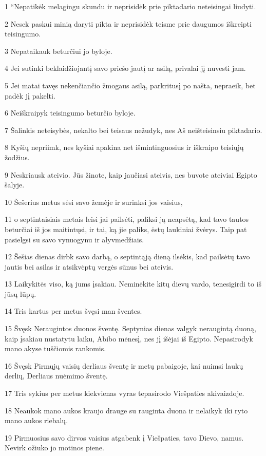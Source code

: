 \par 1 “Nepatikėk melagingu skundu ir neprisidėk prie piktadario neteisingai liudyti. 
\par 2 Nesek paskui minią daryti pikta ir neprisidėk teisme prie daugumos iškreipti teisingumo. 
\par 3 Nepataikauk beturčiui jo byloje. 
\par 4 Jei sutinki beklaidžiojantį savo priešo jautį ar asilą, privalai jį nuvesti jam. 
\par 5 Jei matai tavęs nekenčiančio žmogaus asilą, parkritusį po našta, nepraeik, bet padėk jį pakelti. 
\par 6 Neiškraipyk teisingumo beturčio byloje. 
\par 7 Šalinkis neteisybės, nekalto bei teisaus nežudyk, nes Aš neišteisinsiu piktadario. 
\par 8 Kyšių nepriimk, nes kyšiai apakina net išmintinguosius ir iškraipo teisiųjų žodžius. 
\par 9 Neskriausk ateivio. Jūs žinote, kaip jaučiasi ateivis, nes buvote ateiviai Egipto šalyje. 
\par 10 Šešerius metus sėsi savo žemėje ir surinksi jos vaisius, 
\par 11 o septintaisiais metais leisi jai pailsėti, paliksi ją neapsėtą, kad tavo tautos beturčiai iš jos maitintųsi, ir tai, ką jie paliks, ėstų laukiniai žvėrys. Taip pat pasielgsi su savo vynuogynu ir alyvmedžiais. 
\par 12 Šešias dienas dirbk savo darbą, o septintąją dieną ilsėkis, kad pailsėtų tavo jautis bei asilas ir atsikvėptų vergės sūnus bei ateivis. 
\par 13 Laikykitės viso, ką jums įsakiau. Neminėkite kitų dievų vardo, tenesigirdi to iš jūsų lūpų. 
\par 14 Tris kartus per metus švęsi man šventes. 
\par 15 Švęsk Neraugintos duonos šventę. Septynias dienas valgyk neraugintą duoną, kaip įsakiau nustatytu laiku, Abibo mėnesį, nes jį išėjai iš Egipto. Nepasirodyk mano akyse tuščiomis rankomis. 
\par 16 Švęsk Pirmųjų vaisių derliaus šventę ir metų pabaigoje, kai nuimsi laukų derlių, Derliaus nuėmimo šventę. 
\par 17 Tris sykius per metus kiekvienas vyras tepasirodo Viešpaties akivaizdoje. 
\par 18 Neaukok mano aukos kraujo drauge su rauginta duona ir nelaikyk iki ryto mano aukos riebalų. 
\par 19 Pirmuosius savo dirvos vaisius atgabenk į Viešpaties, tavo Dievo, namus. Nevirk ožiuko jo motinos piene. 
